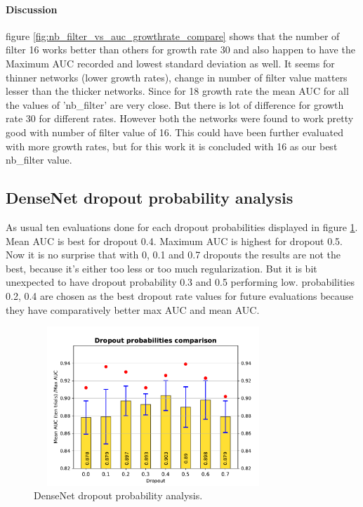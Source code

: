 \paragraph{Discussion\\}
figure \ref{fig:nb_filter_vs_auc_growthrate_compare} shows that the number of filter 16 works better than others for growth rate 30 and also happen to have the Maximum AUC recorded and lowest standard deviation as well. 
It seems for thinner networks (lower growth rates), change in number of filter value matters lesser than the thicker networks. 
Since for 18 growth rate the mean AUC for all the values of 'nb\_filter' are very close. But there is lot of difference for growth rate 30 for different rates.
However both the networks were found to work pretty good with number of filter value of 16. This could have been further evaluated with more growth rates, but for this work it is concluded with 16 as our best nb\_filter value.

\subsection{DenseNet dropout probability analysis}
As usual ten evaluations done for each dropout probabilities displayed in figure \ref{fig:auc_vs_densenet_dropout}. Mean AUC is best for dropout 0.4. Maximum AUC is highest for dropout 0.5.
Now it is no surprise that with 0, 0.1 and 0.7 dropouts the results are not the best, because it's either too less or too much regularization. But it is bit unexpected to have dropout probability 0.3 and 0.5 performing low. 
probabilities 0.2, 0.4 are chosen as the best dropout rate values for future evaluations because they have comparatively better max AUC and mean AUC.

\begin{figure}[ht]
\centering
\includegraphics[width=9cm,height=6cm]{images/densenet/siamese/densenet_siamese_dropout}
\caption{DenseNet dropout probability analysis.}
\label{fig:auc_vs_densenet_dropout}
\end{figure}

